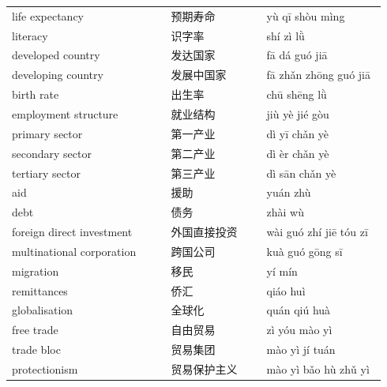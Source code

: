 \documentclass[11pt]{article}
\begin{document}
\begin{longtable}{@{}p{0.40\linewidth}p{0.24\linewidth}p{0.30\linewidth}@{}}
life expectancy & 预期寿命 & yù qī shòu mìng \\
literacy & 识字率 & shí zì lǜ \\
developed country & 发达国家 & fā dá guó jiā \\
developing country & 发展中国家 & fā zhǎn zhōng guó jiā \\
birth rate & 出生率 & chū shēng lǜ \\
employment structure & 就业结构 & jiù yè jié gòu \\
primary sector & 第一产业 & dì yī chǎn yè \\
secondary sector & 第二产业 & dì èr chǎn yè \\
tertiary sector & 第三产业 & dì sān chǎn yè \\
aid & 援助 & yuán zhù \\
debt & 债务 & zhài wù \\
foreign direct investment & 外国直接投资 & wài guó zhí jiē tóu zī \\
multinational corporation & 跨国公司 & kuà guó gōng sī \\
migration & 移民 & yí mín \\
remittances & 侨汇 & qiáo huì \\
globalisation & 全球化 & quán qiú huà \\
free trade & 自由贸易 & zì yóu mào yì \\
trade bloc & 贸易集团 & mào yì jí tuán \\
protectionism & 贸易保护主义 & mào yì bǎo hù zhǔ yì \\
\end{longtable}
\end{document}
